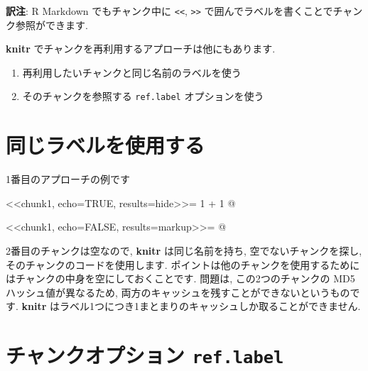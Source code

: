 \documentclass[
  lualatex,ja=standard,jafont=noto-otf]{bxjsreport}
\newenvironment{Shaded}{\begin{snugshade}}{\end{snugshade}}
\newcommand{\NormalTok}[1]{#1}
\providecommand{\tightlist}{%
  \setlength{\itemsep}{0pt}\setlength{\parskip}{0pt}}
\begin{document}
\textbf{訳注}: R Markdown でもチャンク中に
\texttt{\textless{}\textless{}}, \texttt{\textgreater{}\textgreater{}}
で囲んでラベルを書くことでチャンク参照ができます.

\textbf{knitr} でチャンクを再利用するアプローチは他にもあります.

\begin{enumerate}
\def\labelenumi{\arabic{enumi}.}
\tightlist
\item
  再利用したいチャンクと同じ名前のラベルを使う
\item
  そのチャンクを参照する \texttt{ref.label} オプションを使う
\end{enumerate}

\hypertarget{ux540cux3058ux30e9ux30d9ux30ebux3092ux4f7fux7528ux3059ux308b}{%
\section*{同じラベルを使用する}\label{ux540cux3058ux30e9ux30d9ux30ebux3092ux4f7fux7528ux3059ux308b}}

1番目のアプローチの例です

\begin{Shaded}
\begin{Highlighting}[]
\NormalTok{\textless{}\textless{}chunk1, echo=TRUE, results=\textquotesingle{}hide\textquotesingle{}\textgreater{}\textgreater{}=}
\NormalTok{1 + 1}
\NormalTok{@}

\NormalTok{\textless{}\textless{}chunk1, echo=FALSE, results=\textquotesingle{}markup\textquotesingle{}\textgreater{}\textgreater{}=}
\NormalTok{@}
\end{Highlighting}
\end{Shaded}

2番目のチャンクは空なので, \textbf{knitr} は同じ名前を持ち,
空でないチャンクを探し, そのチャンクのコードを使用します.
ポイントは他のチャンクを使用するためにはチャンクの中身を空にしておくことです.
問題は, この2つのチャンクの MD5 ハッシュ値が異なるため,
両方のキャッシュを残すことができないというものです. \textbf{knitr}
はラベル1つにつき1まとまりのキャッシュしか取ることができません.

\hypertarget{ux30c1ux30e3ux30f3ux30afux30aaux30d7ux30b7ux30e7ux30f3-ref.label}{%
\section*{\texorpdfstring{チャンクオプション
\texttt{ref.label}}{チャンクオプション ref.label}}\label{ux30c1ux30e3ux30f3ux30afux30aaux30d7ux30b7ux30e7ux30f3-ref.label}}
\end{document}
